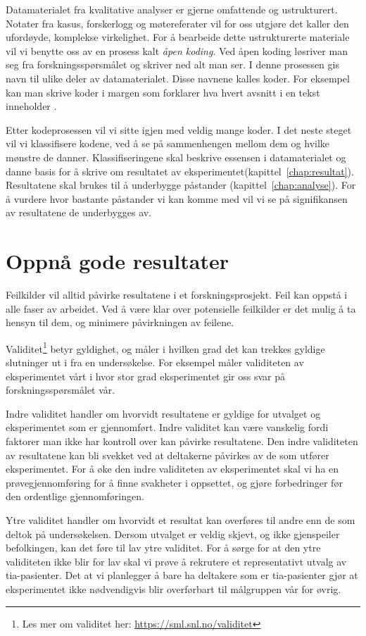 Datamaterialet fra kvalitative analyser er gjerne omfattende og ustrukturert. Notater fra kasus, forskerlogg og møtereferater vil for oss utgjøre det \citep{patton2002qualitative} kaller den ufordøyde, komplekse virkelighet. For å bearbeide dette ustrukturerte materiale vil vi benytte oss av en prosess kalt \textit{åpen koding}. Ved åpen koding løsriver man seg fra forskningsspørsmålet og skriver ned alt man ser. I denne prosessen gis navn til ulike deler av datamaterialet. Disse navnene kalles koder. For eksempel kan man skrive koder i margen som forklarer hva hvert avsnitt i en tekst inneholder \citep{nilssen2012analyse}. 

Etter kodeprosessen vil vi sitte igjen med veldig mange koder. I det neste steget vil vi klassifisere kodene, ved å se på sammenhengen mellom dem og hvilke mønstre de danner. Klassifiseringene skal beskrive essensen i datamaterialet og danne basis for å skrive om resultatet av eksperimentet(kapittel~\ref{chap:resultat}). Resultatene skal brukes til å underbygge påstander (kapittel~\ref{chap:analyse}). For å vurdere hvor bastante påstander vi kan komme med vil vi se på signifikansen av resultatene de underbygges av.


\section{Oppnå gode resultater} 
Feilkilder vil alltid påvirke resultatene i et forskningsprosjekt. Feil kan oppstå i alle faser av arbeidet. Ved å være klar over potensielle feilkilder er det mulig å ta hensyn til dem, og minimere påvirkningen av feilene.

Validitet\footnote{Les mer om validitet her: \url{https://sml.snl.no/validitet}} betyr gyldighet, og måler i hvilken grad det kan trekkes gyldige slutninger ut i fra en undersøkelse. For eksempel måler validiteten av eksperimentet vårt i hvor stor grad eksperimentet gir oss svar på forskningsspørsmålet vår.

Indre validitet handler om hvorvidt resultatene er gyldige for utvalget og eksperimentet som er gjennomført. Indre validitet kan være vanskelig fordi faktorer man ikke har kontroll over kan påvirke resultatene. Den indre validiteten av resultatene kan bli svekket ved at deltakerne påvirkes av de som utfører eksperimentet. For å øke den indre validiteten av eksperimentet skal vi ha en prøvegjennomføring for å finne svakheter i oppsettet, og gjøre forbedringer før den ordentlige gjennomføringen. 

Ytre validitet handler om hvorvidt et resultat kan overføres til andre enn de som deltok på undersøkelsen. Dersom utvalget er veldig skjevt, og ikke gjenspeiler befolkingen, kan det føre til lav ytre validitet. For å sørge for at den ytre validiteten ikke blir for lav skal vi prøve å rekrutere et representativt utvalg av \acrshort{tia}-pasienter. Det at vi planlegger å bare ha deltakere som er \acrshort{tia}-pasienter gjør at eksperimentet ikke nødvendigvis blir overførbart til målgruppen vår for øvrig. 

